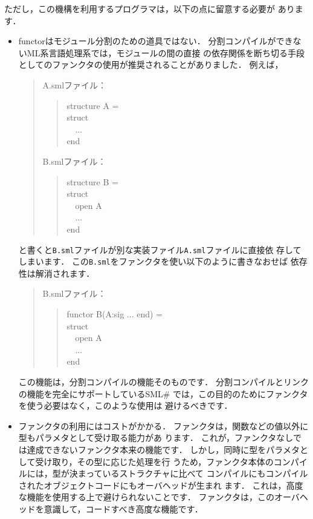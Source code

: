 \documentclass{jbook}
\newcommand{\smlsharp}{SML\#}
\newcommand{\myem}{\mbox{\ \ }}
\newenvironment{program}{\begin{quote}\begin{tt}}%
                        {\end{tt}\end{quote}}
\begin{document}
	ただし，この機構を利用するプログラマは，以下の点に留意する必要が
あります．
\begin{itemize}
\item functorはモジュール分割のための道具ではない．
	分割コンパイルができないML系言語処理系では，モジュールの間の直接
の依存関係を断ち切る手段としてのファンクタの使用が推奨されることがありました．
	例えば，
\begin{quote}
\begin{minipage}{0.9\textwidth}
A.smlファイル：
\begin{program}
structure A =\\
struct\\
\myem   ...\\
end
\end{program}
B.smlファイル：
\begin{program}
structure B = \\
struct\\
\myem  open A\\
\myem  ...\\
end
\end{program}
\end{minipage}
\end{quote}
と書くと{\tt B.sml}ファイルが別な実装ファイル{\tt A.sml}ファイルに直接依
存してしまいます．
	この{\tt B.sml}をファンクタを使い以下のように書きなおせば
依存性は解消されます．
\begin{quote}
\begin{minipage}{0.9\textwidth}
B.smlファイル：
\begin{program}
functor B(A:sig ... end) = \\
struct\\
\myem  open A\\
\myem  ...\\
end
\end{program}
\end{minipage}
\end{quote}	
	この機能は，分割コンパイルの機能そのものです．
	分割コンパイルとリンクの機能を完全にサポートしている\smlsharp{}
では，この目的のためにファンクタを使う必要はなく，このような使用は
避けるべきです．

\item ファンクタの利用にはコストがかかる．
	ファンクタは，関数などの値以外に型もパラメタとして受け取る能力があ
ります．
	これが，ファンクタなしでは達成できないファンクタ本来の機能です．
	しかし，同時に型をパラメタとして受け取り，その型に応じた処理を行
うため，ファンクタ本体のコンパイルには，型が決まっているストラクチャに比べて
コンパイルにもコンパイルされたオブジェクトコードにもオーバヘッドが生まれ
ます．
	これは，高度な機能を使用する上で避けられないことです．
	ファンクタは，このオーバヘッドを意識して，コードすべき高度な機能です．
\end{itemize}
\end{document}
